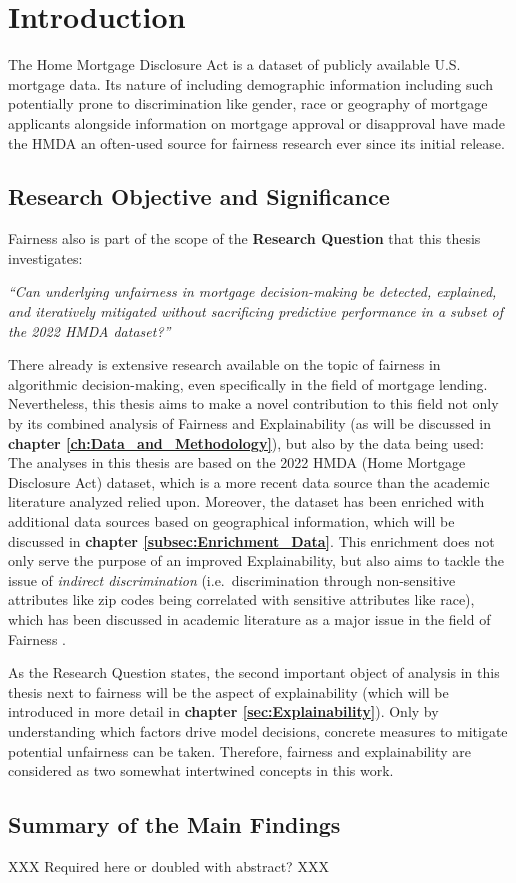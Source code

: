 \chapter{Introduction}\label{ch:Introduction}

The Home Mortgage Disclosure Act \parencite{HMDA2022} is a dataset of publicly available U.S. mortgage data. Its nature of including demographic information including such potentially prone to discrimination like gender, race or geography of mortgage applicants alongside information on mortgage approval or disapproval have made the HMDA an often-used source for fairness research ever since its initial release.

\section{Research Objective and Significance}\label{sec:Research_Objective_and_Significance}

Fairness also is part of the scope of the \textbf{Research Question} that this thesis investigates:

\textit{“Can underlying unfairness in mortgage decision-making be detected, explained, and iteratively mitigated without sacrificing predictive performance in a subset of the 2022 HMDA dataset?”}

There already is extensive research available on the topic of fairness in algorithmic decision-making, even specifically in the field of mortgage lending.
Nevertheless, this thesis aims to make a novel contribution to this field not only by its combined analysis of Fairness and Explainability (as will be discussed in \textbf{chapter \ref{ch:Data_and_Methodology}}),
but also by the data being used: The analyses in this thesis are based on the 2022 HMDA (Home Mortgage Disclosure Act) dataset, which is a more recent data source than the academic literature analyzed relied upon.
Moreover, the dataset has been enriched with additional data sources based on geographical information, which will be discussed in \textbf{chapter \ref{subsec:Enrichment_Data}}.
This enrichment does not only serve the purpose of an improved Explainability, but also aims to tackle the issue of \textit{indirect discrimination} (i.e.\ discrimination through non-sensitive attributes like zip codes being correlated with sensitive attributes like race), 
which has been discussed in academic literature as a major issue in the field of Fairness \parencite{Mehrabi2021}.

As the Research Question states, the second important object of analysis in this thesis next to fairness will be the aspect of explainability (which will be introduced in more detail in \textbf{chapter \ref{sec:Explainability}}). Only by understanding which factors drive model decisions, concrete measures to mitigate potential unfairness can be taken. Therefore, fairness and explainability are considered as two somewhat intertwined concepts in this work.

\section{Summary of the Main Findings}\label{sec:Summary_of_the_Main_Findings}

XXX Required here or doubled with abstract? XXX